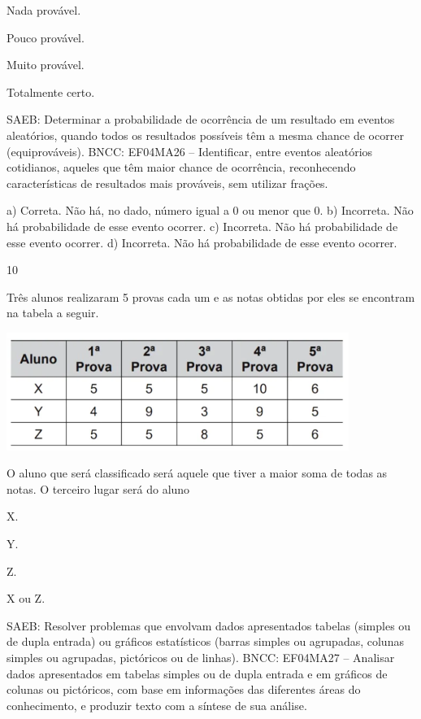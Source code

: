\begin{mdframed}[linewidth=2pt,linecolor=salmao,roundcorner=2pt]
\begin{escolha}
{\begin{escolha}
\begin{escolha}
\item
  Nada provável.
\item
  Pouco provável.
\item
  Muito provável.
\item
  Totalmente certo.
\end{escolha}

SAEB: Determinar a probabilidade de ocorrência de um
resultado em eventos aleatórios, quando todos os resultados possíveis
têm a mesma chance de ocorrer (equiprováveis).
BNCC: EF04MA26 -- Identificar, entre eventos aleatórios cotidianos, aqueles que têm maior chance de
ocorrência, reconhecendo características de resultados mais prováveis, sem utilizar frações.

a) Correta. Não há, no dado, número igual a 0 ou menor que 0.
b) Incorreta. Não há probabilidade de esse evento ocorrer.
c) Incorreta. Não há probabilidade de esse evento ocorrer.
d) Incorreta. Não há probabilidade de esse evento ocorrer.

\num{10}

Três alunos realizaram 5 provas cada um e as notas obtidas por eles se
encontram na tabela a seguir.


\includegraphics[width=4.38462in,height=1.50708in]{media/image157.png}

O aluno que será classificado será aquele que tiver a maior
soma de todas as notas. O terceiro lugar será do aluno

\begin{escolha}
\item
  X.
\item
  Y.
\item
  Z.
\item
  X ou Z.
\end{escolha}

SAEB: Resolver problemas que envolvam dados apresentados
tabelas (simples ou de dupla entrada) ou gráficos estatísticos (barras
simples ou agrupadas, colunas simples ou agrupadas, pictóricos ou de
linhas).
BNCC: EF04MA27 -- Analisar dados apresentados em tabelas simples ou de dupla entrada e em gráficos de
colunas ou pictóricos, com base em informações das diferentes áreas do conhecimento, e produzir
texto com a síntese de sua análise.


\end{escolha}}
\end{escolha}
\end{mdframed}
